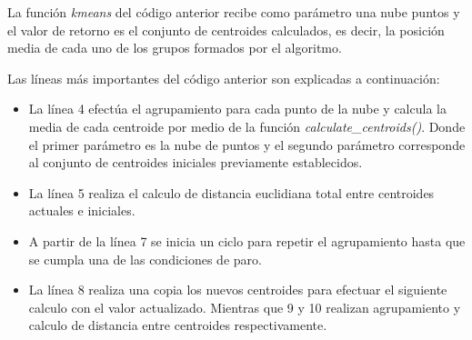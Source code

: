 La función \textit{kmeans} del código anterior recibe como parámetro una nube puntos y el valor de retorno es el conjunto de centroides calculados, es decir, la posición media de cada uno de los grupos formados por el algoritmo.

Las líneas más importantes del código anterior son explicadas a continuación:
\begin{itemize}
    \item La línea 4 efectúa el agrupamiento para cada punto de la nube y calcula la media de cada centroide por medio de la función \textit{calculate\_centroids()}. Donde el primer parámetro es la nube de puntos y el segundo parámetro corresponde al conjunto de centroides iniciales previamente establecidos.
    \item La línea 5 realiza el calculo de distancia euclidiana total entre centroides actuales e iniciales.
    \item A partir de la línea 7 se inicia un ciclo para repetir el agrupamiento hasta que se cumpla una de las condiciones de paro.
    \item La línea 8 realiza una copia los nuevos centroides para efectuar el siguiente calculo con el valor actualizado. Mientras que 9 y 10 realizan agrupamiento y calculo de distancia entre centroides respectivamente.
\end{itemize}


